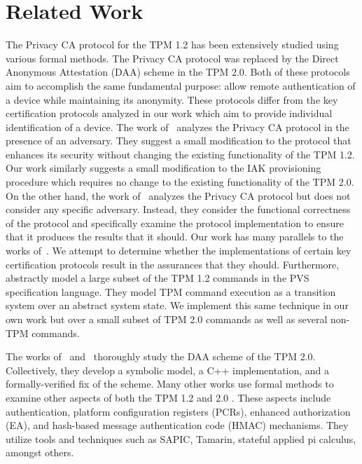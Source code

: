 \documentclass[runningheads]{llncs}
\begin{document}
\section{Related Work}
The Privacy CA protocol for the TPM 1.2 has been extensively studied
using various formal methods. The Privacy CA protocol was replaced by
the Direct Anonymous Attestation (DAA) scheme in the TPM 2.0. Both of
these protocols aim to accomplish the same fundamental purpose: allow
remote authentication of a device while maintaining its
anonymity. These protocols differ from the key certification protocols
analyzed in our work which aim to provide individual identification of
a device.  The work of~\citet{PrivacyCAAnalysis-Chen} analyzes the
Privacy CA protocol in the presence of an adversary. They suggest a
small modification to the protocol that enhances its security without
changing the existing functionality of the TPM 1.2. Our work similarly
suggests a small modification to the IAK provisioning procedure which
requires no change to the existing functionality of the TPM 2.0.  On
the other hand, the work of~\citet{PrivacyCAAnalysis-Hall,TPM12Model}
analyzes the Privacy CA protocol but does not consider any specific
adversary. Instead, they consider the functional correctness of the
protocol and specifically examine the protocol implementation to
ensure that it produces the results that it should.  Our work has many
parallels to the works of~\citeauthor{PrivacyCAAnalysis-Hall}.  We
attempt to determine whether the implementations of certain key
certification protocols result in the assurances that they should.
Furthermore,~\citeauthor{PrivacyCAAnalysis-Hall} abstractly model a
large subset of the TPM 1.2 commands in the PVS specification
language. They model TPM command execution as a transition system over
an abstract system state. We implement this same technique in our own
work but over a small subset of TPM 2.0 commands as well as several
non-TPM commands.

The works of~\citet{DAAAnalysis-Whit} and~\citet{DAAAnalysis-Wes}
thoroughly study the DAA scheme of the TPM 2.0. Collectively, they
develop a symbolic model, a C++ implementation, and a
formally-verified fix of the scheme.  Many other works use formal
methods to examine other aspects of both the TPM 1.2
\citep{AuthAnalysis,PCRAnalysis} and 2.0
\citep{EAAnalysis,HMACAnalysis}.  These aspects include
authentication, platform configuration registers (PCRs), enhanced
authorization (EA), and hash-based message authentication code (HMAC)
mechanisms. They utilize tools and techniques such as SAPIC, Tamarin,
stateful applied pi calculus, amongst others.
%
%
%
\end{document}
